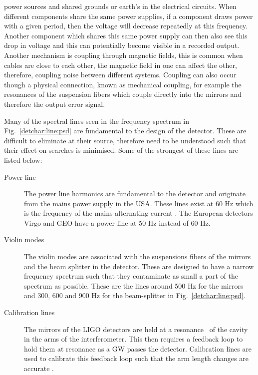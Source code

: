 power sources and shared grounds or earth's in the electrical circuits.  When different components share the same power supplies, if
a component draws power with a given period, then the voltage will decrease
repeatedly at this frequency.  Another component which shares this same power
supply can then also see this drop in voltage and this can potentially become
visible in a recorded output.  Another mechanism is coupling through magnetic
fields, this is common when cables are close to each other, the magnetic field
in one can affect the other, therefore, coupling noise between different
systems.  Coupling can also occur though a physical connection, known as
mechanical coupling, for example the resonances of the suspension fibers which
couple directly into the mirrors and therefore the output error signal.

%

Many of the spectral lines seen in the frequency spectrum in
Fig.~\ref{detchar:line:psd} are fundamental to the design of the detector.
These are difficult to eliminate at their source, therefore need to be understood such that their
effect on searches is minimised.  Some of the strongest of these lines are
listed below:

\begin{description}
	\item[Power line] The power line harmonics are fundamental to the
		detector and originate from the mains power supply in the
		\gls{USA}. These lines exist at 60 Hz which is the frequency of the
		mains alternating current \citep{aasi2015CharacterizationLIGO}. The European
		detectors Virgo and GEO have a power line at 50 Hz instead of 60 Hz.
	
    \item[Violin modes] The violin modes are associated with the
		suspensions fibers of the mirrors and the beam splitter in the detector. These are
		designed to have a narrow frequency spectrum such that they contaminate as
		small a part of the spectrum as possible. These are the lines around 500 Hz for
		the mirrors and 300, 600 and 900 Hz for the beam-splitter \citep{GWOpen} in
		Fig.~\ref{detchar:line:psd}.
	
    \item[Calibration lines] The mirrors of the \gls{LIGO}
		detectors are
		held at a resonance~ of the cavity in the arms of the interferometer. This then
		requires a feedback loop to hold them at resonance as a \gls{GW} passes the
		detector. Calibration lines are used to calibrate this feedback loop such that
		the arm length changes are accurate
		\citep{tuyenbayev2016ImprovingLIGO,coughlin2010NoiseLine}.~  
\end{description}

